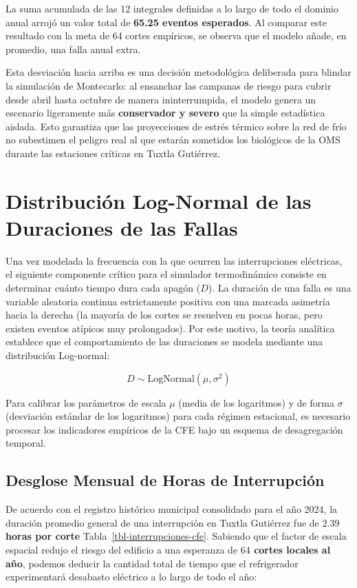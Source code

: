 \documentclass[
  spanish,
  letterpaper,
  DIV=11,
  numbers=noendperiod]{scrreprt}
\theoremstyle{plain}
\theoremstyle{definition}
\theoremstyle{remark}
\begin{document}
La suma acumulada de las 12 integrales definidas a lo largo de todo el
dominio anual arrojó un valor total de \textbf{65.25 eventos esperados}.
Al comparar este resultado con la meta de 64 cortes empíricos, se
observa que el modelo añade, en promedio, una falla anual extra.

Esta desviación hacia arriba es una decisión metodológica deliberada
para blindar la simulación de Montecarlo: al ensanchar las campanas de
riesgo para cubrir desde abril hasta octubre de manera ininterrumpida,
el modelo genera un escenario ligeramente más \textbf{conservador y
severo} que la simple estadística aislada. Esto garantiza que las
proyecciones de estrés térmico sobre la red de frío no subestimen el
peligro real al que estarán sometidos los biológicos de la OMS durante
las estaciones críticas en Tuxtla Gutiérrez.

\section{Distribución Log-Normal de las Duraciones de las
Fallas}\label{distribuciuxf3n-log-normal-de-las-duraciones-de-las-fallas}

Una vez modelada la frecuencia con la que ocurren las interrupciones
eléctricas, el siguiente componente crítico para el simulador
termodinámico consiste en determinar cuánto tiempo dura cada apagón
(\(D\)). La duración de una falla es una variable aleatoria continua
estrictamente positiva con una marcada asimetría hacia la derecha (la
mayoría de los cortes se resuelven en pocas horas, pero existen eventos
atípicos muy prolongados). Por este motivo, la teoría analítica
establece que el comportamiento de las duraciones se modela mediante una
distribución Log-normal:

\[
D \sim \text{LogNormal}(\mu, \sigma^2)
\]

Para calibrar los parámetros de escala \(\mu\) (media de los logaritmos)
y de forma \(\sigma\) (desviación estándar de los logaritmos) para cada
régimen estacional, es necesario procesar los indicadores empíricos de
la CFE bajo un esquema de desagregación temporal.

\subsection{Desglose Mensual de Horas de
Interrupción}\label{desglose-mensual-de-horas-de-interrupciuxf3n}

De acuerdo con el registro histórico municipal consolidado para el año
2024, la duración promedio general de una interrupción en Tuxtla
Gutiérrez fue de \textbf{\(2.39\) horas por corte}
Tabla~\ref{tbl-interrupciones-cfe}. Sabiendo que el factor de escala
espacial redujo el riesgo del edificio a una esperanza de \textbf{\(64\)
cortes locales al año}, podemos deducir la cantidad total de tiempo que
el refrigerador experimentará desabasto eléctrico a lo largo de todo el
año:
\end{document}
